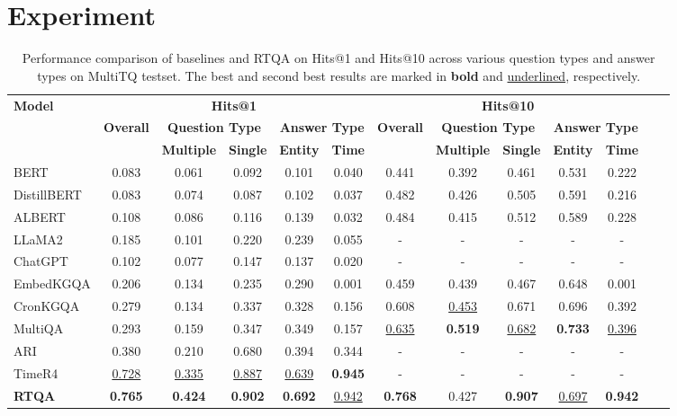\documentclass[11pt]{article}
\begin{document}
\section{Experiment}
\begin{table}
\caption{Performance comparison of baselines and RTQA on Hits@1 and Hits@10 across various question types and answer types on MultiTQ testset. The best and second best results are marked in \textbf{bold} and \underline{underlined}, respectively.}
\label{tab:mainresult_multitq}
\vspace{-0.5em}
\centering
\small
\setlength{\tabcolsep}{5pt}  %
\begin{adjustbox}{max width=\textwidth}
\begin{tabular}{lcccccccccccc}
\toprule
\multirow{3}{2cm}{\textbf{Model}} 
& \multicolumn{5}{c}{\textbf{Hits@1}} 
& \multicolumn{5}{c}{\textbf{Hits@10}} \\
\cmidrule(lr){2-6} \cmidrule(lr){7-11}
& \textbf{Overall} 
& \multicolumn{2}{c}{\textbf{Question Type}} 
& \multicolumn{2}{c}{\textbf{Answer Type}} 
& \textbf{Overall} 
& \multicolumn{2}{c}{\textbf{Question Type}} 
& \multicolumn{2}{c}{\textbf{Answer Type}} \\
\cmidrule(lr){3-4} \cmidrule(lr){5-6}
\cmidrule(lr){8-9} \cmidrule(lr){10-11}
& & \textbf{Multiple} & \textbf{Single} & \textbf{Entity} & \textbf{Time} 
& & \textbf{Multiple} & \textbf{Single} & \textbf{Entity} & \textbf{Time} \\
\midrule
BERT         & 0.083 & 0.061 & 0.092 & 0.101 & 0.040 & 0.441 & 0.392 & 0.461 & 0.531 & 0.222 \\
DistillBERT  & 0.083 & 0.074 & 0.087 & 0.102 & 0.037 & 0.482 & 0.426 & 0.505 & 0.591 & 0.216 \\
ALBERT       & 0.108 & 0.086 & 0.116 & 0.139 & 0.032 & 0.484 & 0.415 & 0.512 & 0.589 & 0.228 \\
LLaMA2       & 0.185 & 0.101 & 0.220 & 0.239 & 0.055 & - & - & - & - & - \\
ChatGPT      & 0.102 & 0.077 & 0.147 & 0.137 & 0.020 & - & - & - & - & - \\
\midrule
EmbedKGQA    & 0.206 & 0.134 & 0.235 & 0.290 & 0.001 & 0.459 & 0.439 & 0.467 & 0.648 & 0.001 \\
CronKGQA     & 0.279 & 0.134 & 0.337 & 0.328 & 0.156 & 0.608 & \underline{0.453} & 0.671 & 0.696 & 0.392 \\
MultiQA     & 0.293 & 0.159 & 0.347 & 0.349 & 0.157 & \underline{0.635} & \textbf{0.519} & \underline{0.682} & \textbf{0.733} & \underline{0.396} \\
\midrule
ARI     & 0.380 & 0.210 & 0.680 & 0.394 & 0.344 & - & - & - & - & - \\
TimeR4     & \underline{0.728} & \underline{0.335} & \underline{0.887} & \underline{0.639} & \textbf{0.945} & - & - & - & - & - \\
\midrule
\textbf{RTQA} & \textbf{0.765} & \textbf{0.424} & \textbf{0.902} & \textbf{0.692} & \underline{0.942} 
                & \textbf{0.768}& 0.427 & \textbf{0.907} & \underline{0.697} & \textbf{0.942} \\
\bottomrule
\end{tabular}
\end{adjustbox}


\end{table}
\end{document}
